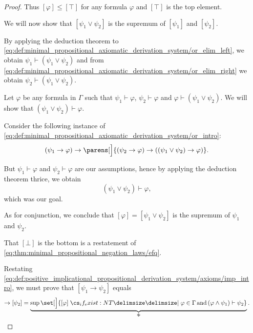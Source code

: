 \begin{proof}
  Thus \( [\varphi] \leq [\top] \) for any formula \( \varphi \) and \( [\top] \) is the top element.

   We will now show that \( [\psi_1 \vee \psi_2] \) is the supremum of \( [\psi_1] \) and \( [\psi_2] \).

  By applying the deduction theorem to \eqref{eq:def:minimal_propositional_axiomatic_derivation_system/or_elim_left}, we obtain \( \psi_1 \vdash (\psi_1 \vee \psi_2) \) and from \eqref{eq:def:minimal_propositional_axiomatic_derivation_system/or_elim_right} we obtain \( \psi_2 \vdash (\psi_1 \vee \psi_2) \).

  Let \( \varphi \) be any formula in \( \Gamma \) such that \( \psi_1 \vdash \varphi \), \( \psi_2 \vdash \varphi \) and \( \varphi \vdash (\psi_1 \vee \psi_2) \). We will show that \( (\psi_1 \vee \psi_2) \vdash \varphi \).

  Consider the following instance of \eqref{eq:def:minimal_propositional_axiomatic_derivation_system/or_intro}:
  \begin{equation*}
    (\psi_1 \rightarrow \varphi) \rightarrow \parens[\Big]{ (\psi_2 \rightarrow \varphi) \rightarrow ((\psi_1 \vee \psi_2) \rightarrow \varphi) }.
  \end{equation*}

  But \( \psi_1 \vdash \varphi \) and \( \psi_2 \vdash \varphi \) are our assumptions, hence by applying the deduction theorem thrice, we obtain
  \begin{equation*}
    (\psi_1 \vee \psi_2) \vdash \varphi,
  \end{equation*}
  which was our goal.

  As for conjunction, we conclude that \( [\varphi] = [\psi_1 \vee \psi_2] \) is the supremum of \( \psi_1 \) and \( \psi_2 \).

   That \( [\bot] \) is the bottom is a restatement of \eqref{eq:thm:minimal_propositional_negation_laws/efq}.

   Restating \eqref{eq:def:positive_implicational_propositional_derivation_system/axioms/imp_intro}, we must prove that \( [\psi_1 \rightarrow \psi_2] \) equals
  \begin{equation*}
    [\psi_1] \rightarrow [\psi_2] = \underbrace{\sup\set[\Big]{ [\varphi] \given* \varphi \in \Gamma \T{and} (\varphi \wedge \psi_1) \vdash \psi_2 }}_{\Phi}.
  \end{equation*}


\end{proof}
